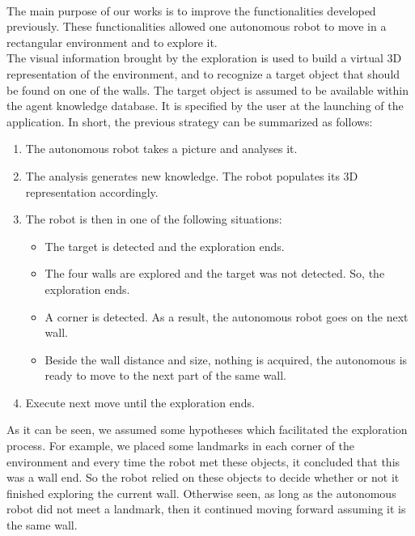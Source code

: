 \documentclass[12pt]{report}
\begin{document}
\paragraph {}
	The main purpose of our works is to improve the functionalities developed previously. These functionalities 
allowed one autonomous robot to move in a rectangular environment and to explore it.\\
	The visual information brought by the exploration is used to build a virtual 3D representation of 
the environment, and to recognize a target object that should be found on one of the walls. The target 
object is assumed to be available within the agent knowledge database. It is specified by 
the user at the launching of the application.
In short, the previous strategy can be summarized as follows:
	\begin{enumerate}
		\item The autonomous robot takes a picture and analyses it.
		\item The analysis generates new knowledge. The robot populates its 3D representation accordingly. 
		\item The robot is then in one of the following situations:
		\begin{itemize}
			\item The target is detected and the exploration ends.
			\item The four walls are explored and the target was not detected. So, the exploration ends.
			\item A corner is detected. As a result, the autonomous robot goes on the next wall.
			\item Beside the wall distance and size, nothing is acquired, the autonomous is ready to move 
to the next part of the same wall.
		\end{itemize}
		\item Execute next move until the exploration ends.
	\end{enumerate}

	
	As it can be seen, we assumed some hypotheses which facilitated the exploration process. For 
example, we placed some landmarks in each corner of the environment and every time the robot met 
these objects, it concluded that this was a wall end. So the robot relied on these objects to decide whether 
or not it finished exploring the current wall. Otherwise seen, as long as the autonomous robot did not meet a landmark, 
then it continued moving forward assuming it is the same wall.\\
	
\end{document}

